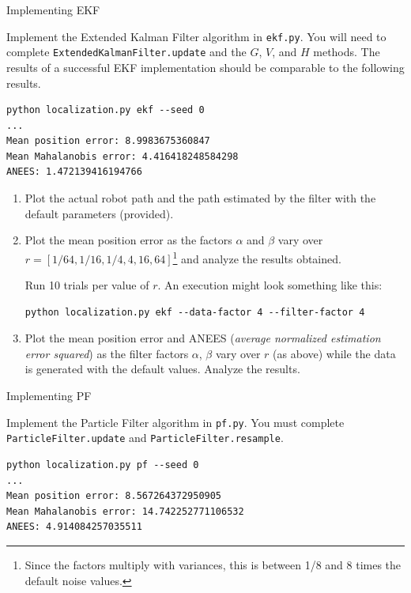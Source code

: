 \documentclass[tp]{lcc}
\begin{document}
\ejercicio Implementing EKF

Implement the Extended Kalman Filter algorithm in \lstinline[style=bash]{ekf.py}. You will need to complete \lstinline[style=bash]{ExtendedKalmanFilter.update} and the $G$, $V$, and $H$ methods. The results of a successful EKF implementation should be comparable to the following results.

\begin{lstlisting}[style=bash]
python localization.py ekf --seed 0
...
Mean position error: 8.9983675360847
Mean Mahalanobis error: 4.416418248584298
ANEES: 1.472139416194766
\end{lstlisting}

	\begin{enumerate}
\item Plot the actual robot path and the path estimated by the filter with the default parameters (provided).
\item Plot the mean position error as the factors $\alpha$ and $\beta$ vary over $r = [1/64, 1/16, 1/4, 4, 16, 64]$\footnote{Since the factors multiply with variances, this is between 1/8 and 8 times the default noise values.} and analyze the results obtained.

Run 10 trials per value of $r$. An execution might look something like this:

\begin{lstlisting}[style=bash]
python localization.py ekf --data-factor 4 --filter-factor 4
\end{lstlisting}

\item Plot the mean position error and ANEES (\emph{average normalized estimation error squared}) as the filter factors $\alpha$, $\beta$ vary over $r$ (as above) while the data is generated with the default values. Analyze the results.
\end{enumerate}

\ejercicio Implementing PF

Implement the Particle Filter algorithm in \lstinline[style=bash]{pf.py}. You must complete \lstinline[style=bash]{ParticleFilter.update} and \lstinline[style=bash]{ParticleFilter.resample}.

\begin{lstlisting}[style=bash]
python localization.py pf --seed 0
...
Mean position error: 8.567264372950905
Mean Mahalanobis error: 14.742252771106532
ANEES: 4.914084257035511
\end{lstlisting}
\end{document}

